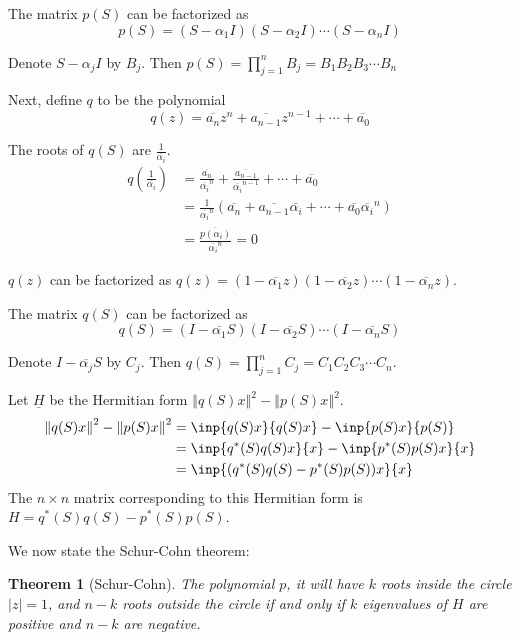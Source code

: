 \documentclass[twofold]{article}
\newcommand*\conj[1]{\overline{#1}}
\newcommand*\adj[1]{#1^*}
\newcommand*\norm[1]{\left \Vert #1 \right\Vert}
\theoremstyle{plain}
\newtheorem{theorem}{Theorem}
\theoremstyle{definition}
\theoremstyle{remark}
\begin{document}
The matrix \(p(S)\) can be factorized as \[p(S) = (S - \alpha_1I) (S - \alpha_2 I) \cdots (S - \alpha_n I)\]

Denote \(S - \alpha_jI\) by \(B_j\). Then \(p(S) =\displaystyle \prod_{j=1}^n B_j = B_1 B_2 B_3 \cdots B_n\)

Next, define \(q\) to be the polynomial 
\[q(z) = \conj{a_n}z^n + \conj{a_{n-1}}z^{n-1} + \cdots + \conj{a_0}\] 

The roots of \(q(S)\) are \(\frac {1}{\conj{\alpha_i}}\). 
\begin{equation*}\begin{split}
q \left(\frac{1}{\conj{\alpha_i}} \right) & = \frac{\conj{a_n}}{\conj{\alpha_i}^n} + \frac{\conj{a_{n-1}}}{\conj{\alpha_i}^{n-1}} + \cdots + \conj{a_0} \\
& = \frac{1}{\conj{\alpha_i}^n} (\conj{a_n} + \conj{a_{n-1}} \conj{\alpha_i} + \cdots + \conj{a_0} \conj{\alpha_i}^n) \\
& = \frac{\conj{p(\alpha_i)}}{\conj{\alpha_i}^n} = 0
\end{split}\end{equation*}

\(q(z)\) can be factorized as \(q(z) = (1 - \conj{\alpha_1}z) (1 - \conj{\alpha_2}z) \cdots (1 - \conj{\alpha_n}z)\). 

The matrix \(q(S)\) can be factorized as
\[q(S) = (I - \conj{\alpha_1}S) (I - \conj{\alpha_2}S) \cdots (I - \conj{\alpha_n}S)\]

 Denote \( I -  \conj{\alpha_j} S\) by \(C_j\). Then \(q(S) =\displaystyle \prod_{j=1}^n C_j = C_1 C_2 C_3 \cdots C_n\).


Let \(\underline{H}\) be the Hermitian form \(\norm{ q(S) x }^2 - \norm{ p(S) x}^2\). 
\begin{equation*} \begin{split}
\norm{ q(S) x }^2 - \norm{ p(S) x}^2 &= \inp{q(S)x}{q(S)x} - \inp{p(S)x}{p(S)} \\
& = \inp{\adj{q}(S) q(S) x}{x} - \inp{\adj{p}(S) p(S) x}{x} \\
& = \inp{(\adj{q}(S) q(S) - \adj{p} (S) p(S) ) x}{x} \\
\end{split} \end{equation*}
The \(n \times n\) matrix corresponding to this Hermitian form is  \(H = \adj{q}(S) q(S) - \adj{p}(S) p(S)\).


We now state the Schur-Cohn theorem:

\begin{theorem} [Schur-Cohn] The polynomial \(p\), it will have \(k\) roots inside the circle \(|z| = 1\), and \(n-k\) roots outside the circle if and only if \(k\) eigenvalues of \(H\) are positive and \(n-k\) are negative. \end{theorem}
\end{document}
